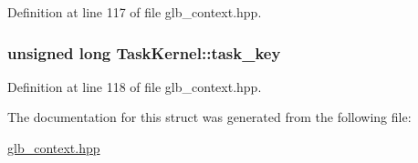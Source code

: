 Definition at line 117 of file glb\_\-context.hpp.\hypertarget{struct_task_kernel_aa63b721f0f2c7d44a178fb87b532c0a0}{
\subsubsection[{task\_\-key}]{\setlength{\rightskip}{0pt plus 5cm}unsigned long {\bf TaskKernel::task\_\-key}}}
\label{struct_task_kernel_aa63b721f0f2c7d44a178fb87b532c0a0}


Definition at line 118 of file glb\_\-context.hpp.

The documentation for this struct was generated from the following file:\begin{DoxyCompactItemize}
\item 
\hyperlink{glb__context_8hpp}{glb\_\-context.hpp}\end{DoxyCompactItemize}
